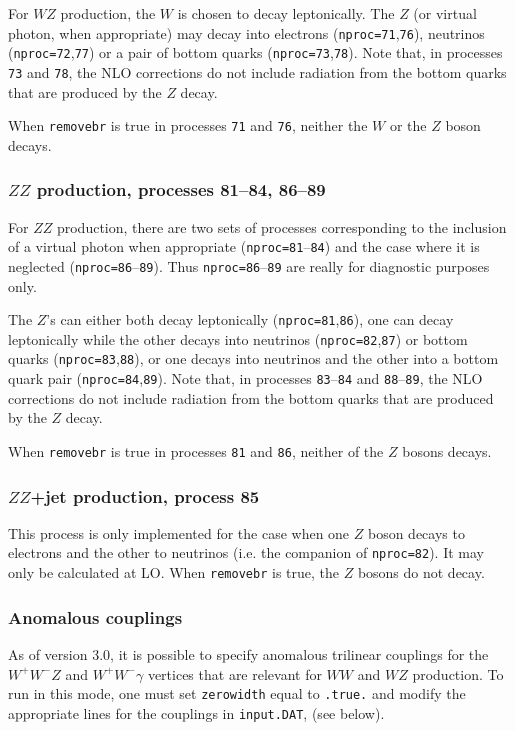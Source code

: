 \documentclass[12pt]{article}
\begin{document}
For $WZ$ production, the $W$ is chosen to decay leptonically. The $Z$ (or
virtual photon, when appropriate) may decay into electrons
({\tt nproc=71},{\tt 76}), neutrinos ({\tt nproc=72},{\tt 77}) or a
pair of bottom quarks ({\tt nproc=73},{\tt 78}).
Note that, in processes
{\tt 73} and {\tt 78}, the NLO corrections do not include radiation from the
bottom quarks that are produced by the $Z$ decay.

When {\tt removebr} is true in processes {\tt 71} and {\tt 76},
neither the $W$ or the $Z$ boson decays.

\subsubsection{$ZZ$ production, processes 81--84, 86--89}

For $ZZ$ production, there are two sets of processes corresponding to the
inclusion of a virtual photon when appropriate ({\tt nproc=81}--{\tt 84})
and the case where it is neglected ({\tt nproc=86}--{\tt 89}).
Thus {\tt nproc=86}--{\tt 89} are really for diagnostic purposes only.

The $Z$'s can either both decay leptonically ({\tt nproc=81},{\tt 86}),
one can decay leptonically while the other decays into neutrinos
({\tt nproc=82},{\tt 87}) or bottom quarks ({\tt nproc=83},{\tt 88}), or
one decays into neutrinos and the other into a bottom quark pair
({\tt nproc=84},{\tt 89}). Note that, in processes
{\tt 83}--{\tt 84} and {\tt 88}--{\tt 89}, the NLO corrections do not include
radiation from the bottom quarks that are produced by the $Z$ decay.

When {\tt removebr} is true in processes {\tt 81} and {\tt 86},
neither of the $Z$ bosons decays.

\subsubsection{$ZZ$+jet production, process 85}

This process is only implemented for the case when one $Z$ boson decays to
electrons and the other to neutrinos (i.e. the companion of {\tt nproc=82}).
It may only be calculated at LO. When {\tt removebr} is true, the $Z$ bosons
do not decay.

\subsubsection{Anomalous couplings}

As of version 3.0, it is possible to specify anomalous trilinear
couplings for the $W^+W^-Z$ and $W^+W^-\gamma$ vertices that are
relevant for $WW$ and $WZ$ production. To run in this mode, one
must set {\tt zerowidth} equal to {\tt .true.}
and modify the appropriate lines for the couplings in {\tt input.DAT},
(see below).
\end{document}
